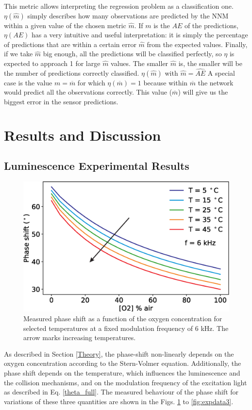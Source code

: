 \documentclass[9pt,twocolumn,twoside,pdftex]{optica}
\begin{document}
This metric allows interpreting the regression problem as a classification one. $\eta(\hat m)$ simply describes how many observations are predicted by the NNM within a given value of the chosen metric $\hat m$. If $m$ is the $AE$ of the predictions, $\eta(AE)$ has a very intuitive and useful interpretation: it is simply the percentage of predictions that are within a certain error $\hat m$ from the expected values. Finally, if we take $\hat m$ big enough, all the predictions will be classified perfectly, so $\eta$ is expected to approach 1 for large $\hat m$ values. The smaller $\hat m$ is, the smaller will be the number of predictions correctly classified.
$\eta(\hat{m})$ with $\hat m = \hat{AE}$
A special case is the value $m=\overline{m}$ for which $\eta(\overline{m})=1$ because within $\overline{m}$ the network would predict all the observations correctly. This value ($\overline{m}$) will give us the biggest error in the sensor predictions.


\section{Results and Discussion}
\label{Results}

\subsection{Luminescence Experimental Results}

\begin{figure}[b!]
\centering
\includegraphics[width=8.2 cm]{phase_O2_T.eps}
\caption{Measured phase shift as a function of the oxygen concentration for selected temperatures at a fixed modulation frequency of 6 kHz. The arrow marks increasing temperatures.}
\label{fig:expdata1}
\end{figure}

As described in Section \ref{Theory}, the phase-shift non-linearly depends on the oxygen concentration according to the Stern-Volmer equation. Additionally, the phase shift depends on the temperature, which influences the luminescence and the collision mechanisms, and on the modulation frequency of the excitation light as described in Eq. \ref{theta_full}. The measured behaviour of the phase shift for variations of these three quantities are shown in the Figs. \ref{fig:expdata1} to \ref{fig:expdata3}.
\end{document}
